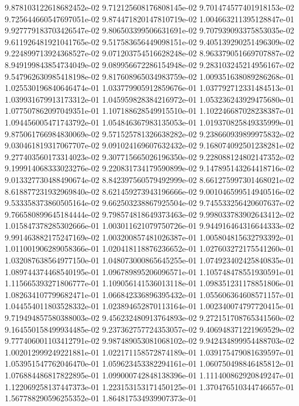 9.878103122618682452e-02
9.712125608176808145e-02
9.701474577401918153e-02
9.725644660547697051e-02
9.874471820147810719e-02
1.004663211395128847e-01
9.927779183703426547e-02
9.806503399506631691e-02
9.707939093375853035e-02
9.611926481921041765e-02
9.517583656449098151e-02
9.405139290251496309e-02
9.224899713924368527e-02
9.071203754516628248e-02
8.963379051669707887e-02
8.949199843854734049e-02
9.089956672286154948e-02
9.283103245214956167e-02
9.547962630985418198e-02
9.817608965034983759e-02
1.009351638089286268e-01
1.025530196840646474e-01
1.033779905912859676e-01
1.037792712331484513e-01
1.039931679913173312e-01
1.045959828384216972e-01
1.053236243929475680e-01
1.077507862097049351e-01
1.107188628549915510e-01
1.102246687028238387e-01
1.094456005471743792e-01
1.054846367983135053e-01
1.019370825849335999e-01
9.875061766984830069e-02
9.571525781326638282e-02
9.238660939899975832e-02
9.030461819317067707e-02
9.091024169607632432e-02
9.168074092501238281e-02
9.277403560173314023e-02
9.307715665026196350e-02
9.228088124802147352e-02
9.199914068333023276e-02
9.220831734179590899e-02
9.147895143264418716e-02
9.013327730488490674e-02
8.842397560579492999e-02
8.661275997301468021e-02
8.618877231932969840e-02
8.621459273943196666e-02
9.001046599514940516e-02
9.533358373860505164e-02
9.662503238867925504e-02
9.745533256420607637e-02
9.766580899645184444e-02
9.798574818649373463e-02
9.998033783902643412e-02
1.015847378285302666e-01
1.003011621079750726e-01
9.944916464316644333e-02
9.991463882175247169e-02
1.003200857481026387e-01
1.005804815632793392e-01
1.011001906289058366e-01
1.020418118876236652e-01
1.027603272175541260e-01
1.032087638564977150e-01
1.048073000865645255e-01
1.074923402425840835e-01
1.089744374468540195e-01
1.096789895206096571e-01
1.105748478551930591e-01
1.115665393271806777e-01
1.109056141536013118e-01
1.098351231178851806e-01
1.082634107799682471e-01
1.066842336896395432e-01
1.055606364608571157e-01
1.044554011803528332e-01
1.023894652870113164e-01
1.002340074797720415e-01
9.719494857580388003e-02
9.456232480913764893e-02
9.272151708765341560e-02
9.164550158499934485e-02
9.237362757724353057e-02
9.406948371221969529e-02
9.777406001103412791e-02
9.987489053081068102e-02
9.942434899954488703e-02
1.002012999249221881e-01
1.022171158572874189e-01
1.039175479081639597e-01
1.053951547762046470e-01
1.059623453382294161e-01
1.060750498846485812e-01
1.076884486817822895e-01
1.099000742848138396e-01
1.111400862920849247e-01
1.122069258137447373e-01
1.223153153171450125e-01
1.370476510344746657e-01
1.567788290596255352e-01
1.864817534939907373e-01
